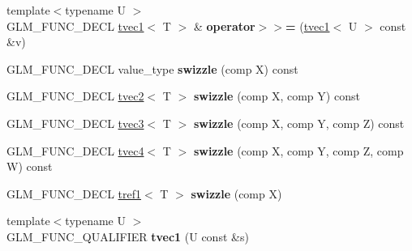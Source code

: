 \begin{DoxyCompactItemize}
\item 
\hypertarget{structglm_1_1detail_1_1tvec1_a370fd88fbbcb8ac5db473ad3fdb4b7e9}{}{\footnotesize template$<$typename U $>$ }\\G\+L\+M\+\_\+\+F\+U\+N\+C\+\_\+\+D\+E\+C\+L \hyperlink{structglm_1_1detail_1_1tvec1}{tvec1}$<$ T $>$ \& {\bfseries operator$>$$>$=} (\hyperlink{structglm_1_1detail_1_1tvec1}{tvec1}$<$ U $>$ const \&v)\label{structglm_1_1detail_1_1tvec1_a370fd88fbbcb8ac5db473ad3fdb4b7e9}

\item 
\hypertarget{structglm_1_1detail_1_1tvec1_ab258e2d7ca9feea296fdba45aa08506f}{}G\+L\+M\+\_\+\+F\+U\+N\+C\+\_\+\+D\+E\+C\+L value\+\_\+type {\bfseries swizzle} (comp X) const \label{structglm_1_1detail_1_1tvec1_ab258e2d7ca9feea296fdba45aa08506f}

\item 
\hypertarget{structglm_1_1detail_1_1tvec1_a5e7f3cadec820ede79ba60558fd997f0}{}G\+L\+M\+\_\+\+F\+U\+N\+C\+\_\+\+D\+E\+C\+L \hyperlink{structglm_1_1detail_1_1tvec2}{tvec2}$<$ T $>$ {\bfseries swizzle} (comp X, comp Y) const \label{structglm_1_1detail_1_1tvec1_a5e7f3cadec820ede79ba60558fd997f0}

\item 
\hypertarget{structglm_1_1detail_1_1tvec1_ac2fe43138ea25472a08647229124b1d1}{}G\+L\+M\+\_\+\+F\+U\+N\+C\+\_\+\+D\+E\+C\+L \hyperlink{structglm_1_1detail_1_1tvec3}{tvec3}$<$ T $>$ {\bfseries swizzle} (comp X, comp Y, comp Z) const \label{structglm_1_1detail_1_1tvec1_ac2fe43138ea25472a08647229124b1d1}

\item 
\hypertarget{structglm_1_1detail_1_1tvec1_a2543087488c26f83e20b92b55977e0fb}{}G\+L\+M\+\_\+\+F\+U\+N\+C\+\_\+\+D\+E\+C\+L \hyperlink{structglm_1_1detail_1_1tvec4}{tvec4}$<$ T $>$ {\bfseries swizzle} (comp X, comp Y, comp Z, comp W) const \label{structglm_1_1detail_1_1tvec1_a2543087488c26f83e20b92b55977e0fb}

\item 
\hypertarget{structglm_1_1detail_1_1tvec1_a6237f003a2637aa33f6912f83ca80e20}{}G\+L\+M\+\_\+\+F\+U\+N\+C\+\_\+\+D\+E\+C\+L \hyperlink{structglm_1_1detail_1_1tref1}{tref1}$<$ T $>$ {\bfseries swizzle} (comp X)\label{structglm_1_1detail_1_1tvec1_a6237f003a2637aa33f6912f83ca80e20}

\item 
\hypertarget{structglm_1_1detail_1_1tvec1_a0d0c075c449b4e8933cc18262a78e857}{}{\footnotesize template$<$typename U $>$ }\\G\+L\+M\+\_\+\+F\+U\+N\+C\+\_\+\+Q\+U\+A\+L\+I\+F\+I\+E\+R {\bfseries tvec1} (U const \&s)\label{structglm_1_1detail_1_1tvec1_a0d0c075c449b4e8933cc18262a78e857}


\end{DoxyCompactItemize}
